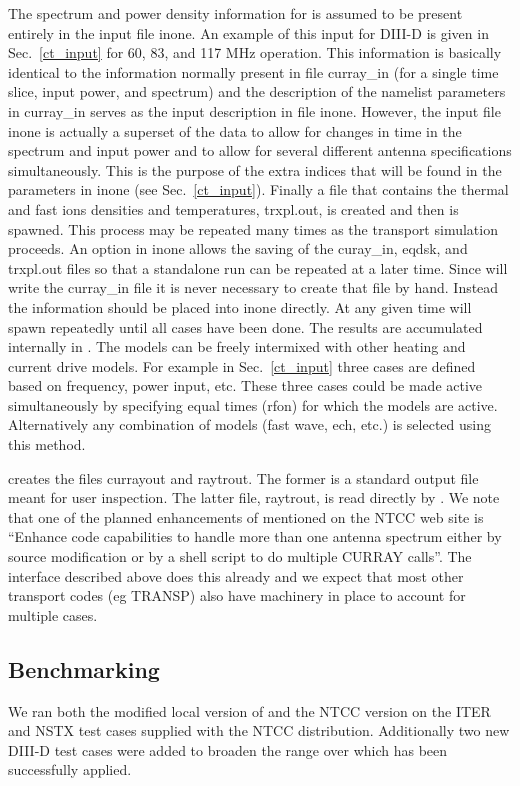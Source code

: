  The spectrum and power density  information for \ct is assumed to be
 present entirely  in the  \ot input file inone. An example of this
 input for DIII-D is given
 in Sec.~\ref{ct_input} for 60, 83, and 117 MHz operation.  This information is
basically identical to the information normally present in file
curray\_in (for a single time slice, input power, and spectrum) and
the description of the namelist parameters in curray\_in serves as
the input description in file inone. However, the \ot input file inone
is actually a superset of the \ct data to allow for changes in time
in the spectrum and input power and to allow for several different
antenna specifications simultaneously. This is the purpose of the
extra indices that will be found in the parameters in inone (see
Sec.~\ref{ct_input}).
 Finally a file that contains the thermal and
fast ions densities and temperatures, trxpl.out, is created and then
\ct is spawned. This process may  be repeated many times as the 
transport simulation proceeds. An  option in inone allows the saving of
the curay\_in, eqdsk, and trxpl.out files so that a standalone \ct
run can be repeated at a later time. Since \ot will write the
curray\_in file it is never necessary to create that file by
hand. Instead the information should  be placed into inone directly.
 At any given
time \ot will spawn \ct repeatedly until all \ct cases have
been done. The results are accumulated internally in \ot. The \ct
models can be freely intermixed with other heating and current drive
models. For example in Sec.~\ref{ct_input} three \ct cases are defined
based on frequency, power input, etc. These three cases could  be made
active simultaneously  by specifying equal times (rfon) for which  the models
are active. Alternatively any combination of models (fast wave,
ech, etc.) is selected using this method. 

\ct creates the files currayout and raytrout. The former is
a standard \ct output file meant for user inspection. The latter
file, raytrout, is read directly by \ot.
 We note that one of the planned enhancements of \ct mentioned on
 the NTCC web site is ``Enhance code capabilities to handle more than
 one antenna  spectrum either by source modification or by a shell
 script to do multiple CURRAY calls''. The \ot interface described
 above  does this already and we expect that most other transport
 codes (eg TRANSP) also have machinery in place to account
 for multiple \ct cases.
 

\subsection{\ct Benchmarking}\label{benchm}
   We ran both the modified
 local version of \ct and the NTCC version on  the ITER and NSTX
 test cases  supplied with the NTCC \ct distribution. Additionally 
 two new DIII-D test cases  were added to broaden the range over 
 which \ct has been successfully applied.

